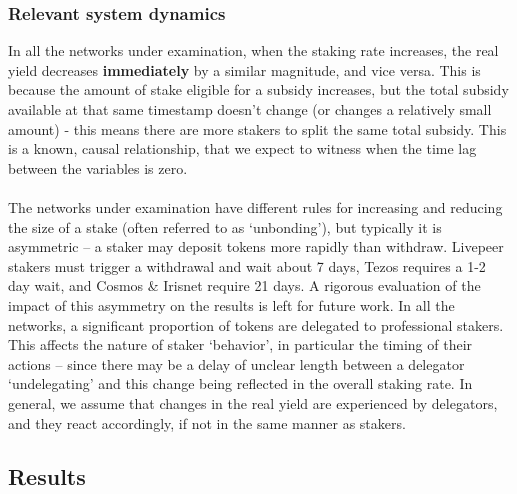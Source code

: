 \documentclass[longbibliography,nofootinbib]{revtex4-1}
\begin{document}
\subsubsection{Relevant system dynamics}\label{dynamics}

In all the networks under examination, when the staking rate increases, the real yield decreases \textbf{immediately} by a similar magnitude, and vice versa. This is because the amount of stake eligible for a subsidy increases, but the total subsidy available at that same timestamp doesn't change (or changes a relatively small amount) - this means there are more stakers to split the same total subsidy. This is a known, causal relationship, that we expect to witness when the time lag between the variables is zero. 
\\\\
The networks under examination have different rules for increasing and reducing the size of a stake (often referred to as `unbonding'), but typically it is asymmetric – a staker may deposit tokens more rapidly than withdraw. Livepeer stakers must trigger a withdrawal and wait about 7 days, Tezos requires a 1-2 day wait, and Cosmos \& Irisnet require 21 days. A rigorous evaluation of the impact of this asymmetry on the results is left for future work. In all the networks, a significant proportion of tokens are delegated to professional stakers. This affects the nature of staker `behavior', in particular the timing of their actions – since there may be a delay of unclear length between a delegator `undelegating' and this change being reflected in the overall staking rate. In general, we assume that changes in the real yield are experienced by delegators, and they react accordingly, if not in the same manner as stakers.

\subsection{Results}
\end{document}
